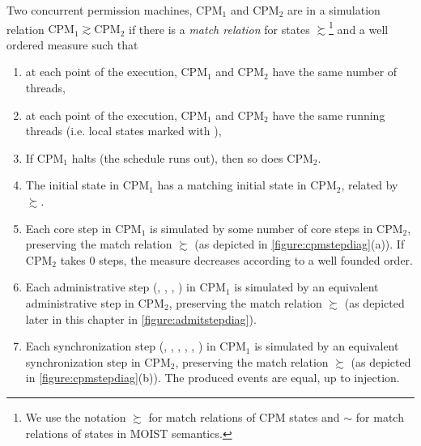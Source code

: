 \begin{definition}\label{def:cpmsim} Two concurrent permission machines, $\text{CPM}_1$ and $\text{CPM}_2$ are in a simulation relation $\text{CPM}_1 \gtrsim \text{CPM}_2$ if there is a \emph{match relation} for states $\succsim$\footnote{We use the notation $\succsim$ for match relations of CPM states and $\sim$ for match relations of states in MOIST semantics.} and a well ordered measure such that

\begin{enumerate}
\item at each point of the execution, $\text{CPM}_1$ and $\text{CPM}_2$ have the same number of threads,
\item at each point of the execution, $\text{CPM}_1$ and $\text{CPM}_2$ have the same running threads (i.e. local states marked with ),
\item If $\text{CPM}_1$ halts (the schedule runs out), then so does $\text{CPM}_2$.
\item The initial state in $\text{CPM}_1$ has a matching initial state in $\text{CPM}_2$, related by $\succsim$.
\item Each core step in $\text{CPM}_1$ is simulated by some number of core steps in $\text{CPM}_2$, preserving the match relation $\succsim$ (as depicted in \cref{figure:cpmstepdiag}(a)). 
If $\text{CPM}_2$ takes 0 steps, the measure decreases according to a well founded order.
\item Each administrative step (, , , ) in $\text{CPM}_1$ is simulated by an equivalent administrative step in $\text{CPM}_2$, preserving the match relation $\succsim$ (as depicted later in this chapter in \cref{figure:admitstepdiag}).
\item Each synchronization step (, , , , , ) in $\text{CPM}_1$ is simulated by an equivalent synchronization step in $\text{CPM}_2$, preserving the match relation $\succsim$ (as depicted in \cref{figure:cpmstepdiag}(b)). The produced events are equal, up to injection.
\end{enumerate}
\end{definition}

